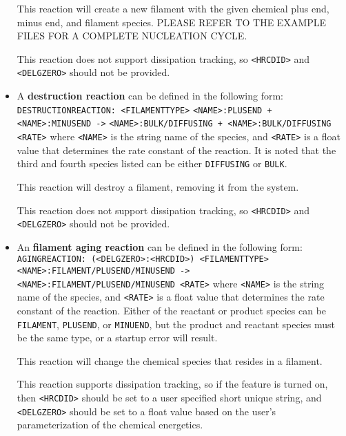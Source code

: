 \documentclass[11pt, oneside]{article}   	%
\begin{document}
\begin{itemize}
	This reaction will create a new filament with the given chemical plus end, minus end, and filament species. PLEASE REFER TO THE EXAMPLE FILES FOR A COMPLETE NUCLEATION CYCLE. 
	
	This reaction does not support dissipation tracking, so \texttt{<HRCDID>} and \texttt{<DELGZERO>} should not be provided.
	
	\item A \textbf{destruction reaction} can be defined in the following form:\newline\newline
	\texttt{DESTRUCTIONREACTION: <FILAMENTTYPE>}\newline
	\texttt{<NAME>:PLUSEND + <NAME>:MINUSEND ->}\newline
	\texttt{<NAME>:BULK/DIFFUSING + <NAME>:BULK/DIFFUSING <RATE>}\newline\newline
	where \texttt{<NAME>} is the string name of the species, and \texttt{<RATE>} is a float value that determines the rate constant of the reaction. It is noted that the third and fourth species listed can be either \texttt{DIFFUSING} or \texttt{BULK}.
	
	This reaction will destroy a filament, removing it from the system.
	
	This reaction does not support dissipation tracking, so \texttt{<HRCDID>} and \texttt{<DELGZERO>} should not be provided.  
	
	\item An \textbf{filament aging reaction} can be defined in the following form:\newline\newline
	\texttt{AGINGREACTION: (<DELGZERO>:<HRCDID>) <FILAMENTTYPE>}\newline
	\texttt{<NAME>:FILAMENT/PLUSEND/MINUSEND ->}\newline
	\texttt{<NAME>:FILAMENT/PLUSEND/MINUSEND <RATE>}\newline\newline
	where \texttt{<NAME>} is the string name of the species, and \texttt{<RATE>} is a float value that determines the rate constant of the reaction. Either of the reactant or product species can be \texttt{FILAMENT}, \texttt{PLUSEND}, or \texttt{MINUEND}, but the product and reactant species must be the same type, or a startup error will result.
	
	This reaction will change the chemical species that resides in a filament.
	
	This reaction supports dissipation tracking, so if the feature is turned on, then \texttt{<HRCDID>} should be set to a user specified short unique string, and \texttt{<DELGZERO>} should be set to a float value based on the user's parameterization of the chemical energetics.
	

\end{itemize}
\end{document}
